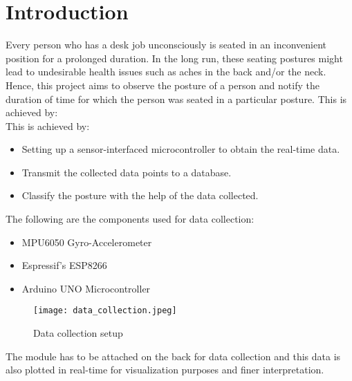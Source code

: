 \documentclass[./main.tex]{subfiles}
\begin{document}
\chapter{Introduction}
Every person who has a desk job unconsciously is seated in an inconvenient position for a prolonged
duration. In the long run, these seating postures might lead to undesirable health issues such as
aches in the back and/or the neck. Hence, this project aims to observe the posture of a person and
notify the duration of time for which the person was seated in a particular posture.
This is achieved by:
\\
This is achieved by:
\begin{itemize}
    \item Setting up a sensor-interfaced microcontroller to obtain the real-time data.
    \item Transmit the collected data points to a database.
    \item Classify the posture with the help of the data collected.
\end{itemize} 
The following are the components used for data collection:
\begin{itemize}
    \item MPU6050 Gyro-Accelerometer
    \item Espressif's ESP8266 
    \item Arduino UNO Microcontroller
\end{itemize}

\begin{figure}[H]
    \centering
    \texttt{[image: data\_collection.jpeg]}
    \caption{Data collection setup}
    \label{fig:datacollect}
\end{figure}


The module has to be attached on the back for data collection and this data is also plotted in real-time for visualization purposes and finer interpretation. 
\end{document}
